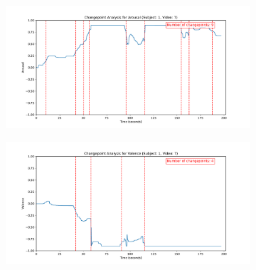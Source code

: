 \documentclass[11pt, letterpaper]{article}
\begin{document}
\begin{figure}
        \centering
    \begin{subfigure}[t]{0.49\textwidth}
        \centering
        \includegraphics[width=\linewidth]{sub_1_changepoints_V7_arousal} 
        \caption{} \label{fig:sub_1_changepoints_V7_arousal}
    \end{subfigure}
    \hfill
    \begin{subfigure}[t]{0.49\textwidth}
        \centering
        \includegraphics[width=\linewidth]{sub_1_changepoints_V7_valence} 
        \caption{} \label{fig:sub_1_changepoints_V7_valence}
    \end{subfigure}

    \vspace{1cm}
    

\end{figure}
\end{document}

